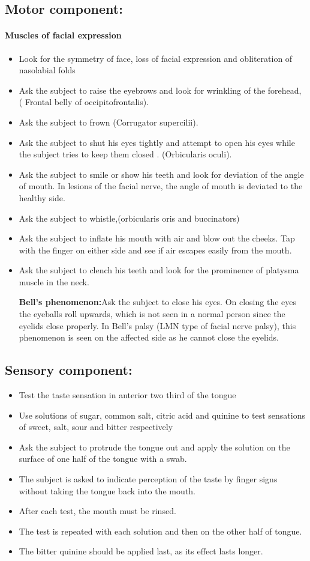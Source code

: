 \documentclass[a4paper,12pt,openany,twoside]{book}
\begin{document}
\subsection*{Motor component:}
\paragraph{Muscles of facial expression}
\begin{itemize}
\item{Look for the symmetry of face, loss of facial expression and obliteration of nasolabial folds}
\item{Ask the subject to raise the eyebrows and look for wrinkling of the forehead, ( Frontal belly of occipitofrontalis).}
\item{Ask the subject to frown (Corrugator supercilii).}
\item{Ask the subject to shut his eyes tightly and attempt to open his eyes while the subject tries to keep them closed . (Orbicularis oculi).}
\item{Ask the subject to smile or show his teeth and look for deviation of the angle of mouth. In lesions of the facial nerve, the angle of mouth is deviated to the healthy side.}
\item{Ask the subject to whistle,(orbicularis oris and buccinators)}
\item{Ask the subject to inflate his mouth with air and blow out the cheeks. Tap with the finger on either side and see if air escapes easily from the mouth.}
\item{Ask the subject to clench his teeth and look for the prominence of platysma muscle in the neck.
	\par
		\textbf{Bell’s phenomenon:}Ask the subject to close his eyes. On closing the eyes the eyeballs roll upwards, which is not seen in a normal person since the eyelids close properly. In Bell’s palsy (LMN type of facial nerve palsy), this phenomenon is seen on the affected side as he cannot close the eyelids.}
\end{itemize}
\subsection*{Sensory component:}
\begin{itemize}
		\itemsep0em
\item{Test the taste sensation in anterior two third of the tongue}
\item{Use solutions of sugar, common salt, citric acid and quinine to test sensations of sweet, salt, sour and bitter respectively}
\item{Ask the subject to protrude the tongue out and apply the solution on the surface of one half of the tongue with a swab.}
\item{The subject is asked to indicate perception of the taste by finger signs without taking the tongue back into the mouth.}
\item{After each test, the mouth must be rinsed.}
\item{The test is repeated with each solution and then on the other half of tongue.}
\item{The bitter quinine should be applied last, as its effect lasts longer.}
\end{itemize}
\end{document}
